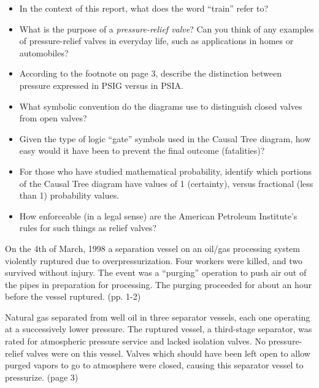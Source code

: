 \begin{itemize}
\item{} In the context of this report, what does the word ``train'' refer to?
\item{} What is the purpose of a {\it pressure-relief valve}?  Can you think of any examples of pressure-relief valves in everyday life, such as applications in homes or automobiles?
\item{} According to the footnote on page 3, describe the distinction between pressure expressed in PSIG versus in PSIA.
\item{} What symbolic convention do the diagrams use to distinguish closed valves from open valves?
\item{} Given the type of logic ``gate'' symbols used in the Causal Tree diagram, how easy would it have been to prevent the final outcome (fatalities)?  
\item{} For those who have studied mathematical probability, identify which portions of the Causal Tree diagram have values of 1 (certainty), versus fractional (less than 1) probability values.
\item{} How enforceable (in a legal sense) are the American Petroleum Institute's rules for such things as relief valves?
\end{itemize}














On the 4th of March, 1998 a separation vessel on an oil/gas processing system violently ruptured due to overpressurization.  Four workers were killed, and two survived without injury.  The event was a ``purging'' operation to push air out of the pipes in preparation for processing.  The purging proceeded for about an hour before the vessel ruptured. (pp. 1-2)

Natural gas separated from well oil in three separator vessels, each one operating at a successively lower pressure.  The ruptured vessel, a third-stage separator, was rated for atmospheric pressure service and lacked isolation valves.  No pressure-relief valves were on this vessel.  Valves which should have been left open to allow purged vapors to go to atmosphere were closed, causing this separator vessel to pressurize. (page 3)

